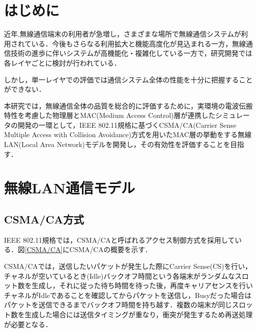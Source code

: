 \documentclass[a4paper,10.5pt]{ltjsarticle}
\begin{document}

\tableofcontents
\thispagestyle{empty}



\clearpage
\setcounter{page}{1}

\section{はじめに}

近年,無線通信端末の利用者が急増し，さまざまな場所で無線通信システムが利用されている．今後もさらなる利用拡大と機能高度化が見込まれる一方，無線通信技術の進歩に伴いシステムが高機能化・複雑化している一方で，研究開発では各レイヤごとに検討が行われている．


しかし，単一レイヤでの評価では通信システム全体の性能を十分に把握することができない．

本研究では，無線通信全体の品質を総合的に評価するために，実環境の電波伝搬特性を考慮した物理層とMAC(Medium Access Control)層が連携したシミュレータの開発の一環として，IEEE 802.11規格に基づくCSMA/CA(Carrier Sense Multiple Access with Collision Avoidance)方式を用いたMAC層の挙動をする無線LAN(Local Area Network)モデルを開発し，その有効性を評価することを目指す．


\clearpage
\section{無線LAN通信モデル}

\subsection{CSMA/CA方式}

IEEE 802.11規格では，CSMA/CAと呼ばれるアクセス制御方式を採用している．図\ref{CSMA/CA}にCSMA/CAの概要を示す．


CSMA/CAでは，送信したいパケットが発生した際にCarrier Sense(CS)を行い，チャネルが空いているとき(Idle)バックオフ時間という各端末がランダムなスロット数を生成し，それに従った待ち時間を待った後，再度キャリアセンスを行いチャネルがIdleであることを確認してからパケットを送信し，Busyだった場合はパケットを送信できるまでバックオフ時間を持ち越す．複数の端末が同じスロット数を生成した場合には送信タイミングが重なり，衝突が発生するため再送処理が必要となる．
\end{document}
